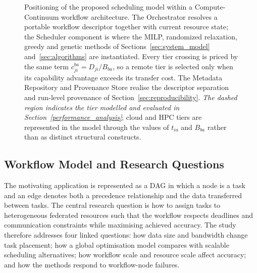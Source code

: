 \begin{figure}[t]
\caption{Positioning of the proposed scheduling model within a Compute-Continuum workflow
architecture. The Orchestrator resolves a portable workflow descriptor together with current
resource state; the Scheduler component is where the MILP, randomized relaxation, greedy and
genetic methods of Sections~\ref{sec:system_model} and~\ref{sec:algorithms} are instantiated.
Every tier crossing is priced by the same term $c_{ji}^{ba}=D_{ji}/B_{ba}$, so a remote tier is
selected only when its capability advantage exceeds its transfer cost. The Metadata Repository
and Provenance Store realise the descriptor separation and run-level provenance of
Section~\ref{sec:reproducibility}. \emph{The dashed region indicates the tier modelled and
evaluated in Section~\ref{performance_analysis}}; cloud and HPC tiers are represented in the
model through the values of $t_{ia}$ and $B_{ba}$ rather than as distinct structural constructs.}
\label{fig:compute_continuum_architecture}
\end{figure}

\subsection{Workflow Model and Research Questions}

The motivating application is represented as a DAG in which a node is a task and an edge denotes both a precedence relationship and the data transferred between tasks. The central research question is how to assign tasks to heterogeneous federated resources such that the workflow respects deadlines and communication constraints while maximising achieved accuracy. The study therefore addresses four linked questions: how data size and bandwidth change task placement; how a global optimisation model compares with scalable scheduling alternatives; how workflow scale and resource scale affect accuracy; and how the methods respond to workflow-node failures.

